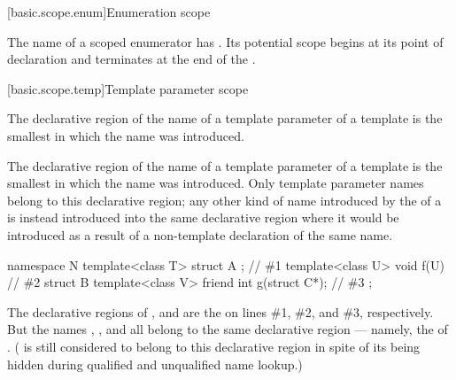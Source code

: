 [basic.scope.enum]{Enumeration scope}%
%

\pnum
The name of a scoped enumerator has
. Its potential scope begins at
its point of declaration and terminates at the end of the
.

[basic.scope.temp]{Template parameter scope}%
%
%

\pnum
The declarative region of the name of a template parameter of a template
 is the smallest 
in which the name was introduced.

\pnum
The declarative region of the name of a template parameter of a template is the smallest
 in which the name was introduced. Only template
parameter names belong to this declarative region; any other kind of name introduced by
the  of a  is instead
introduced into the same declarative region where it would be introduced as a result of
a non-template declaration of the same name.
\begin{example}
\begin{codeblock}
namespace N {
  template<class T> struct A { };               // \#1
  template<class U> void f(U) { }               // \#2
  struct B {
    template<class V> friend int g(struct C*);  // \#3
  };
}
\end{codeblock}
The declarative regions of ,  and  are the
 on lines \#1, \#2, and \#3,
respectively. But the names , ,  and  all belong to
the same declarative region --- namely, the  of .
( is still considered to belong to this declarative region in spite of its
being hidden during qualified and unqualified name lookup.)
\end{example}

